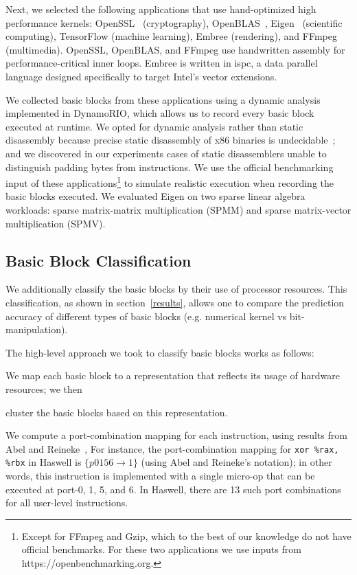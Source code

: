 Next, we selected the following applications that use hand-optimized high performance kernels:
OpenSSL~\cite{openssl} (cryptography), OpenBLAS~\cite{openblas}, Eigen~\cite{eigen} (scientific computing),
TensorFlow\cite{tensorflow} (machine learning),
Embree\cite{embree} (rendering), and FFmpeg (multimedia).
OpenSSL, OpenBLAS, and FFmpeg use handwritten assembly for performance-critical inner loops.
Embree is written in ispc\cite{ispc}, a data parallel language
designed specifically to target Intel's vector extensions.

We collected basic blocks from these applications using
a dynamic analysis implemented in DynamoRIO\cite{dynamorio},
which allows us to record every basic block
executed at runtime.
We opted for dynamic analysis rather than static disassembly
because precise static disassembly of x86 binaries
is undecidable~\cite{disassembly-undecidable};
and we discovered in our experiments cases of
static disassemblers unable to distinguish padding bytes from instructions.
We use the official benchmarking input of these applications\footnote{
Except for FFmpeg and Gzip, which to the best of our knowledge do not have
official benchmarks. For these two applications we use inputs
from https://openbenchmarking.org.
} to simulate realistic execution when recording the basic blocks executed.
We evaluated Eigen on two sparse linear algebra workloads:
sparse matrix-matrix multiplication (SPMM) and 
sparse matrix-vector multiplication (SPMV).

\subsection{Basic Block Classification}\label{classification}
We additionally classify the basic blocks by their use of processor resources.
This classification, as shown in section~\ref{results},
allows one to compare the prediction accuracy of different types of basic blocks 
(e.g. numerical kernel vs bit-manipulation).

The high-level approach we took to classify basic blocks works as follows:
\begin{enumerate*}
\item We map each basic block to a representation
that reflects its usage of hardware resources; we then
\item cluster the basic blocks based on this representation.
\end{enumerate*}

We compute a port-combination mapping for each instruction,
using results from Abel and Reineke~\cite{uops},
For instance,
the port-combination mapping for \verb|xor %rax, %rbx| in Haswell
is $\{ p0156 \rightarrow 1 \}$ (using Abel and Reineke's notation);
in other words, this instruction is implemented 
with a single micro-op that can be executed at port-0, 1, 5, and 6.
In Haswell, there are 13 such port combinations for all user-level instructions.


